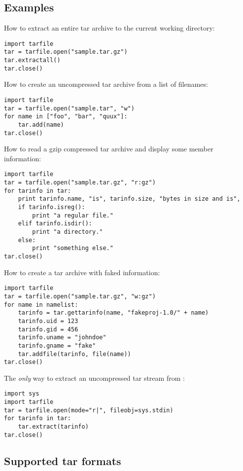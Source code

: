 
\subsection{Examples \label{tar-examples}}

How to extract an entire tar archive to the current working directory:
\begin{verbatim}
import tarfile
tar = tarfile.open("sample.tar.gz")
tar.extractall()
tar.close()
\end{verbatim}

How to create an uncompressed tar archive from a list of filenames:
\begin{verbatim}
import tarfile
tar = tarfile.open("sample.tar", "w")
for name in ["foo", "bar", "quux"]:
    tar.add(name)
tar.close()
\end{verbatim}

How to read a gzip compressed tar archive and display some member information:
\begin{verbatim}
import tarfile
tar = tarfile.open("sample.tar.gz", "r:gz")
for tarinfo in tar:
    print tarinfo.name, "is", tarinfo.size, "bytes in size and is",
    if tarinfo.isreg():
        print "a regular file."
    elif tarinfo.isdir():
        print "a directory."
    else:
        print "something else."
tar.close()
\end{verbatim}

How to create a tar archive with faked information:
\begin{verbatim}
import tarfile
tar = tarfile.open("sample.tar.gz", "w:gz")
for name in namelist:
    tarinfo = tar.gettarinfo(name, "fakeproj-1.0/" + name)
    tarinfo.uid = 123
    tarinfo.gid = 456
    tarinfo.uname = "johndoe"
    tarinfo.gname = "fake"
    tar.addfile(tarinfo, file(name))
tar.close()
\end{verbatim}

The \emph{only} way to extract an uncompressed tar stream from
:
\begin{verbatim}
import sys
import tarfile
tar = tarfile.open(mode="r|", fileobj=sys.stdin)
for tarinfo in tar:
    tar.extract(tarinfo)
tar.close()
\end{verbatim}


\subsection{Supported tar formats \label{tar-formats}}

